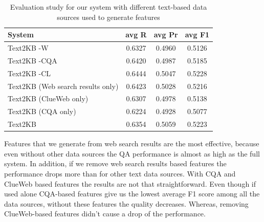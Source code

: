 \begin{table}
\caption{Evaluation study for our system with different text-based data sources used to generate features}
\label{table:ablation:features}
\begin{tabular}{| p{4cm} | c | c | c | }
\hline
System & avg R & avg Pr &  avg F1 \\
\hline
Text2KB -W & 0.6327 & 0.4960 & 0.5126 \\
Text2KB -CQA & 0.6420 & 0.4987 & 0.5185 \\
Text2KB -CL & 0.6444 & 0.5047 & 0.5228 \\
\hline
Text2KB (Web search results only) & 0.6423 & 0.5028 & 0.5216 \\
Text2KB (ClueWeb only) & 0.6307 & 0.4978 & 0.5138 \\
Text2KB (CQA only) & 0.6224 & 0.4928 & 0.5077 \\
\hline
Text2KB & 0.6354 & 0.5059 & 0.5223 \\
\hline
\end{tabular}
\end{table}

Features that we generate from web search results are the most effective, because even without other data sources the QA performance is almost as high as the full system.
In addition, if we remove web search results based features the performance drops more than for other text data sources.
With CQA and ClueWeb based features the results are not that straightforward.
Even though if used alone CQA-based features give us the lowest average F1 score among all the data sources, without these features the quality decreases.
Whereas, removing ClueWeb-based features didn't cause a drop of the performance.

